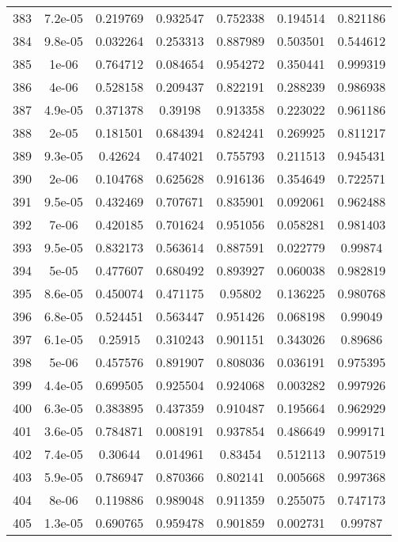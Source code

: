 \begin{table}
\begin{tabular}{c|c|c|c|c|c|c}
383 & 7.2e-05 & 0.219769 & 0.932547 & 0.752338 & 0.194514 & 0.821186\\
384 & 9.8e-05 & 0.032264 & 0.253313 & 0.887989 & 0.503501 & 0.544612\\
385 & 1e-06 & 0.764712 & 0.084654 & 0.954272 & 0.350441 & 0.999319\\
386 & 4e-06 & 0.528158 & 0.209437 & 0.822191 & 0.288239 & 0.986938\\
387 & 4.9e-05 & 0.371378 & 0.39198 & 0.913358 & 0.223022 & 0.961186\\
388 & 2e-05 & 0.181501 & 0.684394 & 0.824241 & 0.269925 & 0.811217\\
389 & 9.3e-05 & 0.42624 & 0.474021 & 0.755793 & 0.211513 & 0.945431\\
390 & 2e-06 & 0.104768 & 0.625628 & 0.916136 & 0.354649 & 0.722571\\
391 & 9.5e-05 & 0.432469 & 0.707671 & 0.835901 & 0.092061 & 0.962488\\
392 & 7e-06 & 0.420185 & 0.701624 & 0.951056 & 0.058281 & 0.981403\\
393 & 9.5e-05 & 0.832173 & 0.563614 & 0.887591 & 0.022779 & 0.99874\\
394 & 5e-05 & 0.477607 & 0.680492 & 0.893927 & 0.060038 & 0.982819\\
395 & 8.6e-05 & 0.450074 & 0.471175 & 0.95802 & 0.136225 & 0.980768\\
396 & 6.8e-05 & 0.524451 & 0.563447 & 0.951426 & 0.068198 & 0.99049\\
397 & 6.1e-05 & 0.25915 & 0.310243 & 0.901151 & 0.343026 & 0.89686\\
398 & 5e-06 & 0.457576 & 0.891907 & 0.808036 & 0.036191 & 0.975395\\
399 & 4.4e-05 & 0.699505 & 0.925504 & 0.924068 & 0.003282 & 0.997926\\
400 & 6.3e-05 & 0.383895 & 0.437359 & 0.910487 & 0.195664 & 0.962929\\
401 & 3.6e-05 & 0.784871 & 0.008191 & 0.937854 & 0.486649 & 0.999171\\
402 & 7.4e-05 & 0.30644 & 0.014961 & 0.83454 & 0.512113 & 0.907519\\
403 & 5.9e-05 & 0.786947 & 0.870366 & 0.802141 & 0.005668 & 0.997368\\
404 & 8e-06 & 0.119886 & 0.989048 & 0.911359 & 0.255075 & 0.747173\\
405 & 1.3e-05 & 0.690765 & 0.959478 & 0.901859 & 0.002731 & 0.99787\\
\end{tabular}
\end{table}
